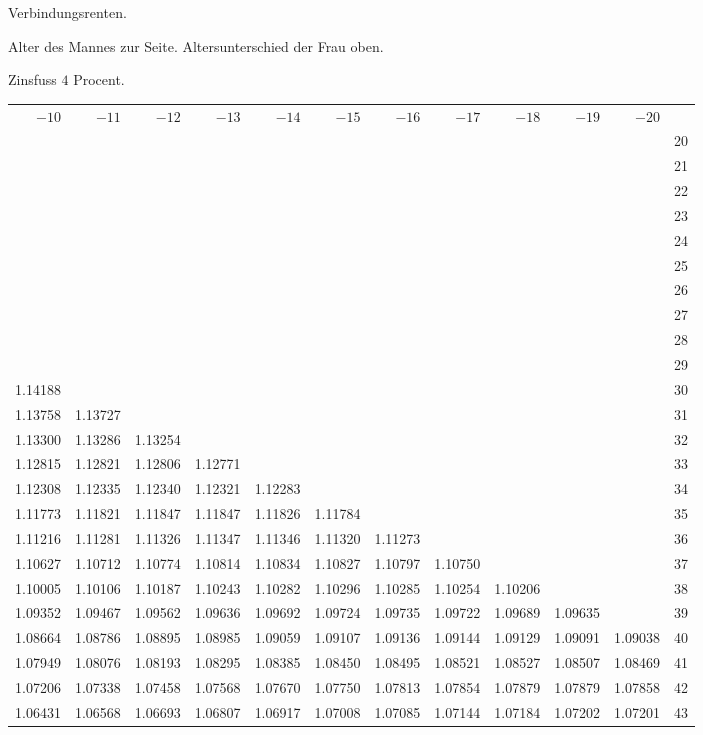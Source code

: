 \clearpage
{}
\begin{center}
Verbindungsrenten.\par\smallskip
Alter des Mannes zur Seite. Altersunterschied der Frau oben.\par\smallskip
Zinsfuss \(4\) Procent.\par\medskip
\fontsize{8}{10}\selectfont\setlength{\tabcolsep}{1.3pt}
\begin{tabular}{|rrrrrrrrrrr|r|}
\hline
\(-10\)&\(-11\)&\(-12\)&\(-13\)&\(-14\)&\(-15\)&\(-16\)&\(-17\)&\(-18\)&\(-19\)&\(-20\)&\\[8pt]
&&&&&&&&&&&20\\
&&&&&&&&&&&21\\
&&&&&&&&&&&22\\
&&&&&&&&&&&23\\
&&&&&&&&&&&24\\[5pt]
&&&&&&&&&&&25\\
&&&&&&&&&&&26\\
&&&&&&&&&&&27\\
&&&&&&&&&&&28\\
&&&&&&&&&&&29\\[5pt]
1.14188&&&&&&&&&&&30\\
1.13758&1.13727&&&&&&&&&&31\\
1.13300&1.13286&1.13254&&&&&&&&&32\\
1.12815&1.12821&1.12806&1.12771&&&&&&&&33\\
1.12308&1.12335&1.12340&1.12321&1.12283&&&&&&&34\\[5pt]
1.11773&1.11821&1.11847&1.11847&1.11826&1.11784&&&&&&35\\
1.11216&1.11281&1.11326&1.11347&1.11346&1.11320&1.11273&&&&&36\\
1.10627&1.10712&1.10774&1.10814&1.10834&1.10827&1.10797&1.10750&&&&37\\
1.10005&1.10106&1.10187&1.10243&1.10282&1.10296&1.10285&1.10254&1.10206&&&38\\
1.09352&1.09467&1.09562&1.09636&1.09692&1.09724&1.09735&1.09722&1.09689&1.09635&&39\\[5pt]
1.08664&1.08786&1.08895&1.08985&1.09059&1.09107&1.09136&1.09144&1.09129&1.09091&1.09038&40\\
1.07949&1.08076&1.08193&1.08295&1.08385&1.08450&1.08495&1.08521&1.08527&1.08507&1.08469&41\\
1.07206&1.07338&1.07458&1.07568&1.07670&1.07750&1.07813&1.07854&1.07879&1.07879&1.07858&42\\
1.06431&1.06568&1.06693&1.06807&1.06917&1.07008&1.07085&1.07144&1.07184&1.07202&1.07201&43\\

\end{tabular}
\end{center}
